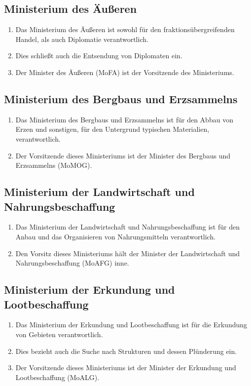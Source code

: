\documentclass{article}
\begin{document}
\subsection{Ministerium des Äußeren}
\begin{enumerate}[(1)]
    \item Das Ministerium des Äußeren ist sowohl für den fraktionsübergreifenden Handel, als auch Diplomatie verantwortlich.
    \item Dies schließt auch die Entsendung von Diplomaten ein.
    \item Der Minister des Äußeren (MoFA) ist der Vorsitzende des Ministeriums.
\end{enumerate}

\subsection{Ministerium des Bergbaus und Erzsammelns}
\begin{enumerate}[(1)]
    \item Das Ministerium des Bergbaus und Erzsammelns ist für den Abbau von Erzen und sonstigen, für den Untergrund typischen Materialien, verantwortlich.
    \item Der Vorsitzende dieses Ministeriums ist der Minister des Bergbaus und Erzsammelns (MoMOG).
\end{enumerate}

\subsection{Ministerium der Landwirtschaft und Nahrungsbeschaffung}
\begin{enumerate}[(1)]
    \item Das Ministerium der Landwirtschaft und Nahrungsbeschaffung ist für den Anbau und das Organisieren von Nahrungsmitteln verantwortlich.
    \item Den Vorsitz dieses Ministeriums hält der Minister der Landwirtschaft und Nahrungsbeschaffung (MoAFG) inne.
\end{enumerate}

\subsection{Ministerium der Erkundung und Lootbeschaffung}
\begin{enumerate}[(1)]
    \item Das Ministerium der Erkundung und Lootbeschaffung ist für die Erkundung von Gebieten verantwortlich.
    \item Dies bezieht auch die Suche nach Strukturen und dessen Plünderung ein.
    \item Der Vorsitzende dieses Ministeriums ist der Minister der Erkundung und Lootbeschaffung (MoALG).
\end{enumerate}
\end{document}

